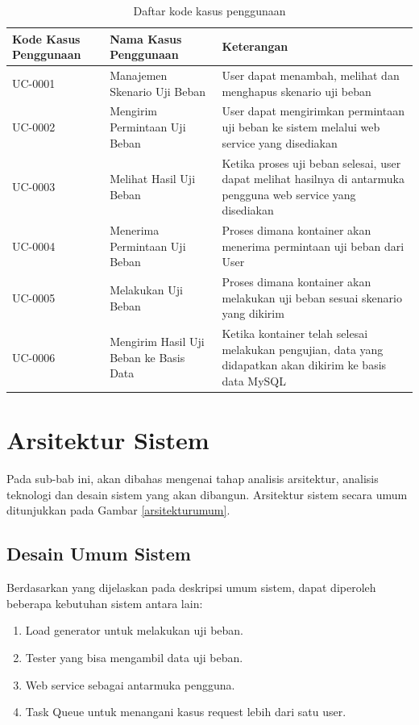     	\begin{longtable}{|p{}|p{}|p{}|}
    		\caption{Daftar kode kasus penggunaan} \label{tabelusecase} \\
    		\hline
    		\textbf{Kode Kasus Penggunaan} & \textbf{Nama Kasus Penggunaan} & \textbf{Keterangan} \\ \hline
    		\endhead
    		\endfoot
    		\endlastfoot
    		UC-0001 & Manajemen Skenario Uji Beban & User dapat menambah, melihat dan menghapus skenario uji beban \\ \hline
    		UC-0002 & Mengirim Permintaan Uji Beban & User dapat mengirimkan permintaan uji beban ke sistem melalui web service yang disediakan \\ \hline
    		UC-0003 & Melihat Hasil Uji Beban & Ketika proses uji beban selesai, user dapat melihat hasilnya di antarmuka pengguna web service yang disediakan \\ \hline
    		UC-0004 & Menerima Permintaan Uji Beban & Proses dimana kontainer akan menerima permintaan uji beban dari User \\ \hline
    		UC-0005 & Melakukan Uji Beban & Proses dimana kontainer akan melakukan uji beban sesuai skenario yang dikirim \\ \hline
    		UC-0006 & Mengirim Hasil Uji Beban ke Basis Data & Ketika kontainer telah selesai melakukan pengujian, data yang didapatkan akan dikirim ke basis data MySQL \\ \hline
    	\end{longtable}
    
    \section{Arsitektur Sistem}
    	Pada sub-bab ini, akan dibahas mengenai tahap analisis arsitektur, analisis teknologi dan desain sistem yang akan dibangun. Arsitektur sistem secara umum ditunjukkan pada Gambar \ref{arsitekturumum}.

    	\subsection{Desain Umum Sistem}
    		Berdasarkan yang dijelaskan pada deskripsi umum sistem, dapat diperoleh beberapa kebutuhan sistem antara lain:
    		\begin{enumerate}
    			\item Load generator untuk melakukan uji beban.
    			\item Tester yang bisa mengambil data uji beban.
    			\item Web service sebagai antarmuka pengguna.
    			\item Task Queue untuk menangani kasus request lebih dari satu user.
    		\end{enumerate}
    	

